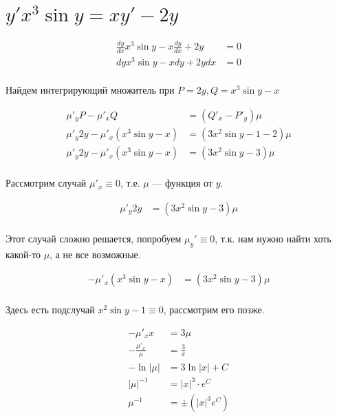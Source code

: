 

\cfoot{}



\section{\(y' x^3 \sin y = xy' - 2y\)}

\begin{align*}
    \frac{dy}{dx} x^3 \sin y - x\frac{dy}{dx} + 2y & = 0 \\
    dy x^3 \sin y - xdy + 2ydx                     & = 0 \\
\end{align*}

Найдем интегрирующий множитель при $P = 2y, Q = x^3 \sin y - x$

\begin{align*}
    \mu'_y P - \mu'_x Q                 & = (Q'_x - P'_y) \mu         \\
    \mu'_y 2y - \mu'_x (x^3 \sin y - x) & = (3x^2 \sin y - 1 - 2) \mu \\
    \mu'_y 2y - \mu'_x (x^3 \sin y - x) & = (3x^2 \sin y - 3) \mu     \\
\end{align*}

Рассмотрим случай $\mu'_x \equiv0$, т.е. $\mu$ --- функция от $y$.

\begin{align*}
    \mu'_y 2y & = (3x^2 \sin y - 3) \mu \\
\end{align*}

Этот случай сложно решается, попробуем $\mu_y'\equiv0$, т.к. нам нужно найти хоть какой-то $\mu$, а не все возможные.

\begin{align*}
    - \mu'_x (x^3 \sin y - x) & = (3x^2 \sin y - 3) \mu \\
\end{align*}

Здесь есть подслучай $x^2\sin y - 1 \equiv 0$, рассмотрим его позже.

\begin{align*}
    - \mu'_x x           & = 3 \mu           \\
    - \frac{\mu'_x}{\mu} & = \frac{3}{x}     \\
    - \ln |\mu|          & = 3\ln|x| + C     \\
    |\mu|^{-1}           & = |x|^3 \cdot e^C \\
    \mu^{-1}             & = \pm(|x|^3 e^C)  \\
\end{align*}

